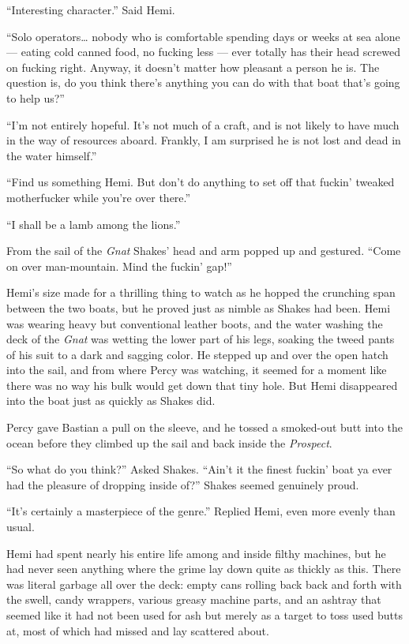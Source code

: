 \documentclass[
]{scrbook}
\begin{document}
``Interesting character.'' Said Hemi.

``Solo operators\ldots{} nobody who is comfortable spending days or
weeks at sea alone --- eating cold canned food, no fucking less --- ever
totally has their head screwed on fucking right. Anyway, it doesn't
matter how pleasant a person he is. The question is, do you think
there's anything you can do with that boat that's going to help us?''

``I'm not entirely hopeful. It's not much of a craft, and is not likely
to have much in the way of resources aboard. Frankly, I am surprised he
is not lost and dead in the water himself.''

``Find us something Hemi. But don't do anything to set off that fuckin'
tweaked motherfucker while you're over there.''

``I shall be a lamb among the lions.''

From the sail of the \emph{Gnat} Shakes' head and arm popped up and
gestured. ``Come on over man-mountain. Mind the fuckin' gap!''

Hemi's size made for a thrilling thing to watch as he hopped the
crunching span between the two boats, but he proved just as nimble as
Shakes had been. Hemi was wearing heavy but conventional leather boots,
and the water washing the deck of the \emph{Gnat} was wetting the lower
part of his legs, soaking the tweed pants of his suit to a dark and
sagging color. He stepped up and over the open hatch into the sail, and
from where Percy was watching, it seemed for a moment like there was no
way his bulk would get down that tiny hole. But Hemi disappeared into
the boat just as quickly as Shakes did.

Percy gave Bastian a pull on the sleeve, and he tossed a smoked-out butt
into the ocean before they climbed up the sail and back inside the
\emph{Prospect}.

``So what do you think?'' Asked Shakes. ``Ain't it the finest fuckin'
boat ya ever had the pleasure of dropping inside of?'' Shakes seemed
genuinely proud.

``It's certainly a masterpiece of the genre.'' Replied Hemi, even more
evenly than usual.

Hemi had spent nearly his entire life among and inside filthy machines,
but he had never seen anything where the grime lay down quite as thickly
as this. There was literal garbage all over the deck: empty cans rolling
back back and forth with the swell, candy wrappers, various greasy
machine parts, and an ashtray that seemed like it had not been used for
ash but merely as a target to toss used butts at, most of which had
missed and lay scattered about.
\end{document}
